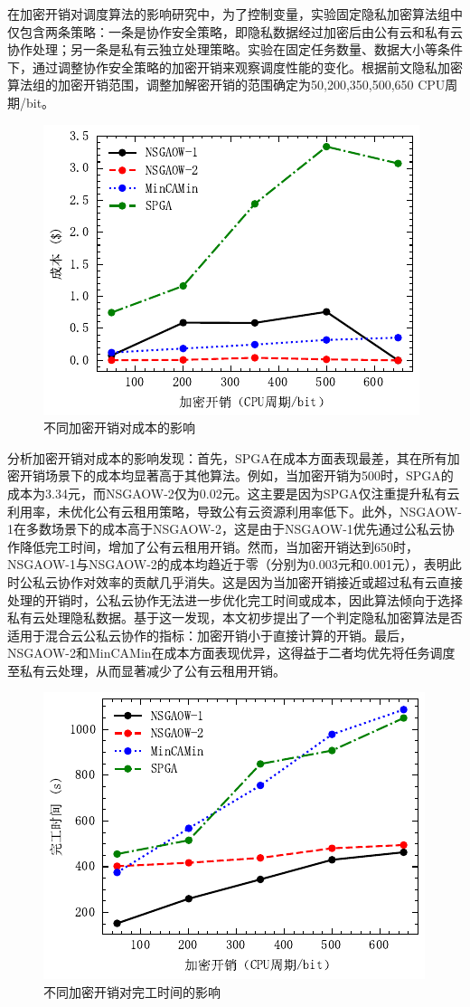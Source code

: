 在加密开销对调度算法的影响研究中，为了控制变量，实验固定隐私加密算法组中仅包含两条策略：一条是协作安全策略，即隐私数据经过加密后由公有云和私有云协作处理；另一条是私有云独立处理策略。实验在固定任务数量、数据大小等条件下，通过调整协作安全策略的加密开销来观察调度性能的变化。根据前文隐私加密算法组的加密开销范围，调整加解密开销的范围确定为50,200,350,500,650 CPU周期/bit。

\begin{figure}
    \includegraphics{img/enc_ovhd_vs_cost.pdf}
    \caption{不同加密开销对成本的影响}
\end{figure}

分析加密开销对成本的影响发现：首先，SPGA在成本方面表现最差，其在所有加密开销场景下的成本均显著高于其他算法。例如，当加密开销为500时，SPGA的成本为3.34元，而NSGAOW-2仅为0.02元。这主要是因为SPGA仅注重提升私有云利用率，未优化公有云租用策略，导致公有云资源利用率低下。此外，NSGAOW-1在多数场景下的成本高于NSGAOW-2，这是由于NSGAOW-1优先通过公私云协作降低完工时间，增加了公有云租用开销。然而，当加密开销达到650时，NSGAOW-1与NSGAOW-2的成本均趋近于零（分别为0.003元和0.001元），表明此时公私云协作对效率的贡献几乎消失。这是因为当加密开销接近或超过私有云直接处理的开销时，公私云协作无法进一步优化完工时间或成本，因此算法倾向于选择私有云处理隐私数据。基于这一发现，本文初步提出了一个判定隐私加密算法是否适用于混合云公私云协作的指标：加密开销小于直接计算的开销。最后，NSGAOW-2和MinCAMin在成本方面表现优异，这得益于二者均优先将任务调度至私有云处理，从而显著减少了公有云租用开销。

\begin{figure}
    \includegraphics{img/enc_ovhd_vs_makespan.pdf}
    \caption{不同加密开销对完工时间的影响}
\end{figure}

